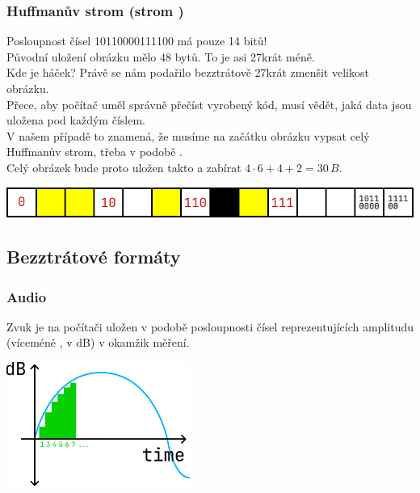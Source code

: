 \documentclass[aspectratio=169,11pt,svgnames]{beamer}
\begin{document}
\begin{frame}
 \frametitle{Huffmanův strom (strom )}
 Posloupnost čísel 10110000111100 má pouze \alert{14 bitů}!\pause\\
 Původní uložení obrázku mělo 48 bytů. To je asi 27krát méně.\pause\\
 Kde je háček? Právě se nám podařilo bezztrátově 27krát zmenšit velikost
 obrázku.\pause\\
 Přece, aby počítač uměl správně přečíst vyrobený kód, musí vědět, jaká data
 jsou uložena pod každým číslem.\pause\\
 V našem případě to znamená, že musíme na začátku obrázku vypsat \alert{celý
 Huffmanův strom}, třeba v podobě .\pause\\
 Celý obrázek bude proto uložen takto a zabírat $4 \cdot 6 + 4 + 2 = 30\,B$.
 \begin{center}
  \includegraphics[width=\textwidth]{tree-7.pdf}
  \vspace*{-.5em}
 \end{center}
\end{frame}

\subsection{Bezztrátové formáty}

\begin{frame}
 \subsectionpage
\end{frame}

\begin{frame}
 \frametitle{Audio}
 Zvuk je na počítači uložen v podobě posloupnosti čísel reprezentujících
 \alert{amplitudu} (víceméně , v dB) \alert{v okamžik měření}.
 \pause
 \begin{center}
  \includegraphics[width=6cm]{amplitude.pdf}
 \end{center}
\end{frame}
\end{document}
